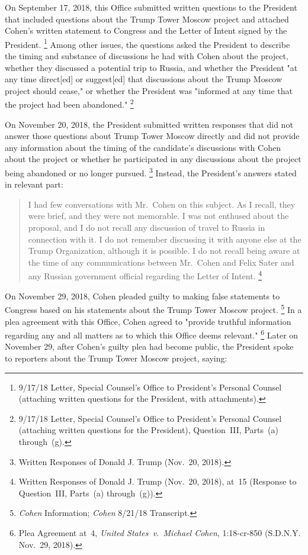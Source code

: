{On September 17, 2018, this Office submitted written questions to the President that included questions about the Trump Tower Moscow project and attached Cohen's written statement to Congress and the Letter of Intent signed by the President.%
\footnote{9/17/18 Letter, Special Counsel's Office to President's Personal Counsel (attaching written questions for the President, with attachments).}
Among other issues, the questions asked the President to describe the timing and substance of discussions he had with Cohen about the project, whether they discussed a potential trip to Russia, and whether the President "at any time direct[ed] or suggest[ed] that discussions about the Trump Moscow project should cease," or whether the President was "informed at any time that the project had been abandoned."%
\footnote{9/17/18 Letter, Special Counsel's Office to President's Personal Counsel (attaching written questions for the President), Question~III, Parts~(a) through~(g).}

On November 20, 2018, the President submitted written responses that did not answer those questions about Trump Tower Moscow directly and did not provide any information about the timing of the candidate's discussions with Cohen about the project or whether he participated in any discussions about the project being abandoned or no longer pursued.%
\footnote{Written Responses of Donald J. Trump (Nov.~20, 2018).}
Instead, the President's answers stated in relevant part:

\begin{quote}
I had few conversations with Mr.~Cohen on this subject.
As I recall, they were brief, and they were not memorable.
I was not enthused about the proposal, and I do not recall any discussion of travel to Russia in connection with it.
I do not remember discussing it with anyone else at the Trump Organization, although it is possible.
I do not recall being aware at the time of any communications between Mr.~Cohen and Felix Sater and any Russian government official regarding the Letter of Intent.%
\footnote{Written Responses of Donald J. Trump (Nov.~20, 2018), at~15 (Response to Question~III, Parts~(a) through~(g)).}
\end{quote}

On November 29, 2018, Cohen pleaded guilty to making false statements to Congress based on his statements about the Trump Tower Moscow project.%
\footnote{\textit{Cohen} Information;
\textit{Cohen} 8/21/18 Transcript.}
In a plea agreement with this Office, Cohen agreed to "provide truthful information regarding any and all matters as to which this Office deems relevant."%
\footnote{Plea Agreement at~4, \textit{United States~v.\ Michael Cohen}, 1:18-cr-850 (S.D.N.Y. Nov.~29, 2018).}
Later on November 29, after Cohen's guilty plea had become public, the President spoke to reporters about the Trump Tower Moscow project, saying:

}
